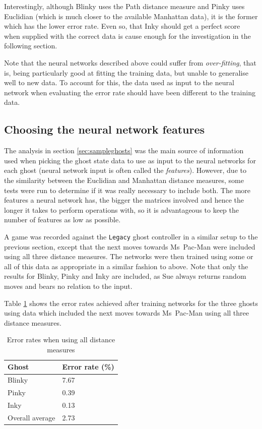 Interestingly, although Blinky uses the Path distance measure and Pinky uses Euclidian (which is much closer to the available Manhattan data), it is the former which has the lower error rate.  Even so, that Inky should get a perfect score when supplied with the correct data is cause enough for the investigation in the following section.

Note that the neural networks described above could suffer from \emph{over-fitting}, that is, being particularly good at fitting the training data, but unable to generalise well to new data.  To account for this, the data used as input to the neural network when evaluating the error rate should have been different to the training data.

\subsection{Choosing the neural network features}

The analysis in section \ref{sec:sampleghosts} was the main source of information used when picking the ghost state data to use as input to the neural networks for each ghost (neural network input is often called the \emph{features}).  However, due to the similarity between the Euclidian and Manhattan distance measures, some tests were run to determine if it was really necessary to include both.  The more features a neural network has, the bigger the matrices involved and hence the longer it takes to perform operations with, so it is advantageous to keep the number of features as low as possible.

A game was recorded against the {\tt Legacy} ghost controller in a similar setup to the previous section, except that the next moves towards Ms~Pac-Man were included using all three distance measures.  The networks were then trained using some or all of this data as appropriate in a similar fashion to above.  Note that only the results for Blinky, Pinky and Inky are included, as Sue always returns random moves and bears no relation to the input.

Table \ref{tab:alldm} shows the error rates achieved after training networks for the three ghosts using data which included the next moves towards Ms~Pac-Man using all three distance measures.

\begin{table}[ht]
\centering
\begin{tabular}{ll}
\toprule
Ghost & Error rate (\%) \\
\midrule
Blinky & 7.67 \\
Pinky & 0.39 \\
Inky & 0.13 \\
\midrule
Overall average & 2.73 \\
\bottomrule
\end{tabular}
\caption{Error rates when using all distance measures}
\label{tab:alldm}
\end{table}

